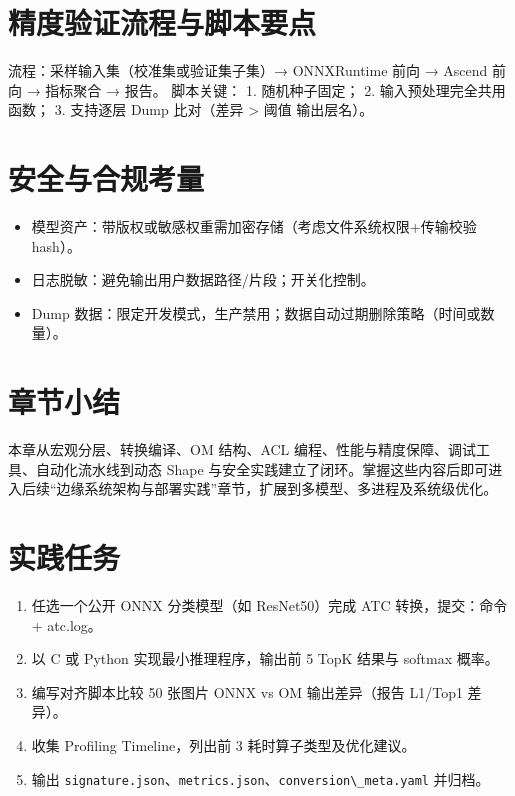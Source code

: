 \section{精度验证流程与脚本要点}\label{ux7cbeux5ea6ux9a8cux8bc1ux6d41ux7a0bux4e0eux811aux672cux8981ux70b9}

流程：采样输入集（校准集或验证集子集）→ ONNXRuntime 前向 → Ascend 前向 →
指标聚合 → 报告。 脚本关键： 1. 随机种子固定； 2.
输入预处理完全共用函数； 3. 支持逐层 Dump 比对（差异 \textgreater{} 阈值
输出层名）。

\section{安全与合规考量}\label{ux5b89ux5168ux4e0eux5408ux89c4ux8003ux91cf}

\begin{itemize}
\tightlist
\item
  模型资产：带版权或敏感权重需加密存储（考虑文件系统权限+传输校验
  hash）。
\item
  日志脱敏：避免输出用户数据路径/片段；开关化控制。
\item
  Dump
  数据：限定开发模式，生产禁用；数据自动过期删除策略（时间或数量）。
\end{itemize}

\section{章节小结}\label{ux7ae0ux8282ux5c0fux7ed3}

本章从宏观分层、转换编译、OM 结构、ACL
编程、性能与精度保障、调试工具、自动化流水线到动态 Shape
与安全实践建立了闭环。掌握这些内容后即可进入后续``边缘系统架构与部署实践''章节，扩展到多模型、多进程及系统级优化。

\section{实践任务}\label{ux5b9eux8df5ux4efbux52a1}

\begin{enumerate}
\def\labelenumi{\arabic{enumi}.}
\tightlist
\item
  任选一个公开 ONNX 分类模型（如 ResNet50）完成 ATC 转换，提交：命令 +
  atc.log。
\item
  以 C 或 Python 实现最小推理程序，输出前 5 TopK 结果与 softmax 概率。
\item
  编写对齐脚本比较 50 张图片 ONNX vs OM 输出差异（报告 L1/Top1 差异）。
\item
  收集 Profiling Timeline，列出前 3 耗时算子类型及优化建议。
\item
  输出
  \passthrough{\lstinline!signature.json!}、\passthrough{\lstinline!metrics.json!}、\passthrough{\lstinline!conversion\_meta.yaml!}
  并归档。
\end{enumerate}
